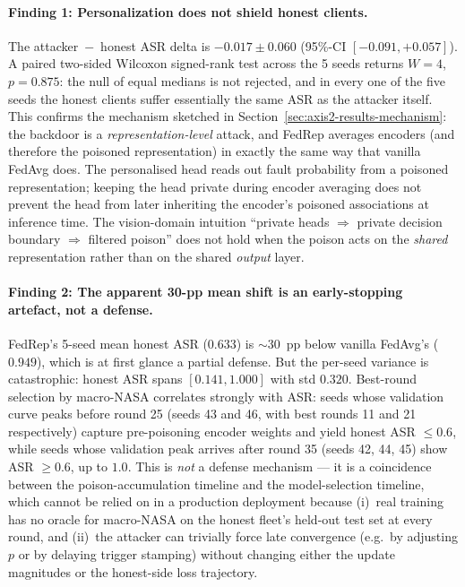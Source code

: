 \documentclass[preprint,12pt,authoryear]{elsarticle}
\begin{document}
\paragraph{Finding 1: Personalization does not shield honest clients.}
The attacker~$-$~honest ASR delta is $-0.017 \pm 0.060$
(95\%-CI $[-0.091, +0.057]$). A paired two-sided Wilcoxon
signed-rank test across the 5 seeds returns $W = 4$, $p = 0.875$:
the null of equal medians is not rejected, and in every one of
the five seeds the honest clients suffer essentially the same ASR
as the attacker itself. This confirms the mechanism sketched
in Section~\ref{sec:axis2-results-mechanism}: the backdoor is a
\emph{representation-level} attack, and FedRep averages encoders
(and therefore the poisoned representation) in exactly the same way
that vanilla FedAvg does. The personalised head reads out fault
probability from a poisoned representation; keeping the head private
during encoder averaging does not prevent the head from later
inheriting the encoder's poisoned associations at inference time.
The vision-domain intuition ``private heads $\Rightarrow$ private
decision boundary $\Rightarrow$ filtered poison''
\citep{Zhang2024SARS} does not hold when the poison acts on the
\emph{shared} representation rather than on the shared \emph{output}
layer.

\paragraph{Finding 2: The apparent 30-pp mean shift is an
early-stopping artefact, not a defense.}
FedRep's 5-seed mean honest ASR ($0.633$) is $\sim 30$~pp below
vanilla FedAvg's ($0.949$), which is at first glance a partial
defense. But the per-seed variance is catastrophic: honest ASR
spans $[0.141, 1.000]$ with std $0.320$. Best-round selection by
macro-NASA correlates strongly with ASR: seeds whose validation
curve peaks before round 25 (seeds 43 and 46, with best rounds 11
and 21 respectively) capture pre-poisoning encoder weights and yield
honest ASR $\leq 0.6$, while seeds whose validation peak arrives
after round 35 (seeds 42, 44, 45) show ASR $\geq 0.6$, up to $1.0$.
This is \emph{not} a defense mechanism --- it is a coincidence
between the poison-accumulation timeline and the model-selection
timeline, which cannot be relied on in a production deployment
because (i)~real training has no oracle for macro-NASA on the
honest fleet's held-out test set at every round, and (ii)~the
attacker can trivially force late convergence (e.g.\ by adjusting
$p$ or by delaying trigger stamping) without changing either the
update magnitudes or the honest-side loss trajectory.
\end{document}
